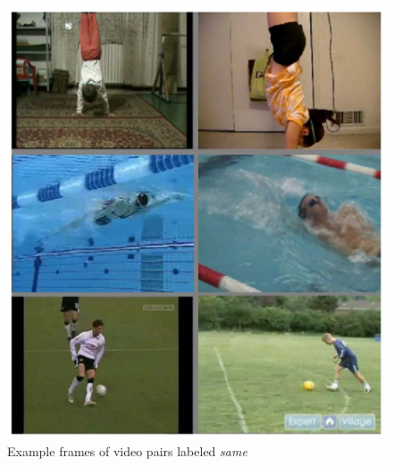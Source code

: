 \begin{minipage}[t]{0.4\textwidth}
    \begin{figure}[H]
        \centering
        \includegraphics[width=\textwidth]{img_datasets/aslan_same}
        \caption{Example frames of video pairs labeled \textit{same} \cite{kliper-gross_action_2012}}
        \label{fig:aslan_same}
    \end{figure}
\end{minipage}
\hfill
